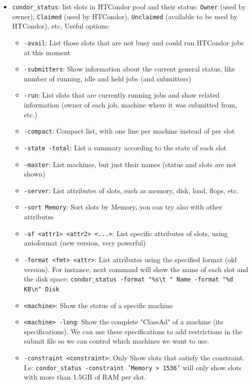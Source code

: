 \documentclass[a4paper,10pt]{article}
\begin{document}
\begin{itemize}
\item \texttt{condor\_status}: list slots in HTCondor pool and their status: \texttt{Owner} (used
by owner), \texttt{Claimed} (used by HTCondor), \texttt{Unclaimed} (available to be used
by HTCondor), etc. Useful options:
\begin{itemize}
\item \texttt{-avail}: List those slots that are not busy and could run HTCondor jobs at
this moment
\item \texttt{-submitters}: Show information about the current general status, like
number of running, idle and held jobs (and submitters)
\item \texttt{-run}: List slots that are currently running jobs and show related
information (owner of each job, machine where it was submitted from, etc.)
\item \texttt{-compact}: Compact list, with one line per machine instead of per slot
\item \texttt{-state -total}: List a summary according to the state of each slot
\item \texttt{-master}: List machines, but just their names (status and slots are not
shown)
\item \texttt{-server}: List attributes of slots, such as memory, disk, load, flops, etc.
\item \texttt{-sort Memory}: Sort slots by Memory, you can try also with other attributes
\item \texttt{-af <attr1> <attr2> <...>}: List specific attributes of slots, using
autoformat (new version, very powerful)
\item \texttt{-format <fmt> <attr>}: List attributes using the specified format (old
version). For instance, next command will show the name of each slot and the
disk space: \texttt{condor\_status -format "\%s\textbackslash{}t " Name -format "\%d KB\textbackslash{}n" Disk}
\item \texttt{<machine>}: Show the status of a specific machine
\item \texttt{<machine> -long}: Show the complete "ClassAd" of a machine (its
specifications). We can use these specifications to add restrictions in the
submit file so we can control which machines we want to use.
\item \texttt{-constraint <constraint>}: Only Show slots that satisfy the
constraint. I.e: \texttt{condor\_status -constraint 'Memory > 1536'} will only show
slots with more than 1.5GB of RAM per slot.
\end{itemize}
\end{itemize}
\end{document}
